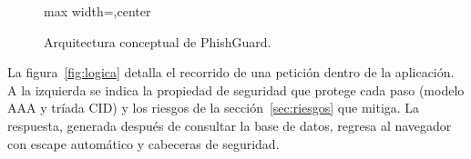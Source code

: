 \documentclass[journal,onecolumn,12pt,draftclsnofoot]{IEEEtran}
\begin{document}
\begin{figure}[htbp]
\begin{adjustbox}{max width=\textwidth,center}
\end{adjustbox}
\caption{Arquitectura conceptual de PhishGuard.}
\end{figure}

La figura~\ref{fig:logica} detalla el recorrido de una petición dentro de la aplicación. A la izquierda se indica la propiedad de seguridad que protege cada paso (modelo AAA y tríada CID) y los riesgos de la sección~\ref{sec:riesgos} que mitiga. La respuesta, generada después de consultar la base de datos, regresa al navegador con escape automático y cabeceras de seguridad.
\end{document}
